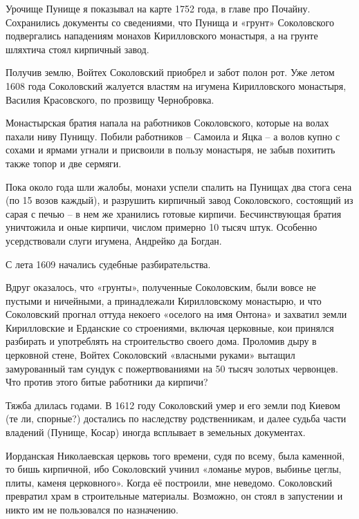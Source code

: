 Урочище Пунище я показывал на карте 1752 года, в главе про Почайну. Сохранились документы со сведениями, что Пунища и «грунт» Соколовского подвергались нападениям монахов Кирилловского монастыря, а на грунте шляхтича стоял кирпичный завод. 


Получив землю, Войтех Соколовский приобрел и забот полон рот. Уже летом 1608 года Соколовский жалуется властям на игумена Кирилловского монастыря, Василия Красовского, по прозвищу Чернобровка.

Монастырская братия напала на работников Соколовского, которые на волах пахали ниву Пунищу. Побили работников – Самоила и Яцка – а волов купно с сохами и ярмами угнали и присвоили в пользу монастыря, не забыв похитить также топор и две сермяги. 

Пока около года шли жалобы, монахи успели спалить на Пунищах два стога сена (по 15 возов каждый), и разрушить кирпичный завод Соколовского, состоящий из сарая с печью – в нем же хранились готовые кирпичи. Бесчинствующая братия уничтожила и оные кирпичи, числом примерно 10 тысяч штук. Особенно усердствовали слуги игумена, Андрейко да Богдан.

С лета 1609 начались судебные разбирательства.

Вдруг оказалось, что «грунты», полученные Соколовским, были вовсе не пустыми и ничейными, а принадлежали Кирилловскому монастырю, и что Соколовский прогнал оттуда некоего «оселого на имя Онтона» и захватил земли Кирилловские и Ерданские со строениями, включая церковные, кои принялся разбирать и употреблять на строительство своего дома. Проломив дыру в церковной стене, Войтех Соколовский «власными руками» вытащил замурованный там сундук с пожертвованиями на 50 тысяч золотых червонцев. Что против этого битые работники да кирпичи?

Тяжба длилась годами. В 1612 году Соколовский умер и его земли под Киевом (те ли, спорные?) достались по наследству родственникам, и далее судьба части владений (Пунище, Косар) иногда всплывает в земельных документах.

Иорданская Николаевская церковь того времени, судя по всему, была каменной, то бишь кирпичной, ибо Соколовский учинил «ломанье муров, выбинье цеглы, плиты, каменя церковного». Когда её построили, мне неведомо. Соколовский превратил храм в строительные материалы. Возможно, он стоял в запустении и никто им не пользовался по назначению.

